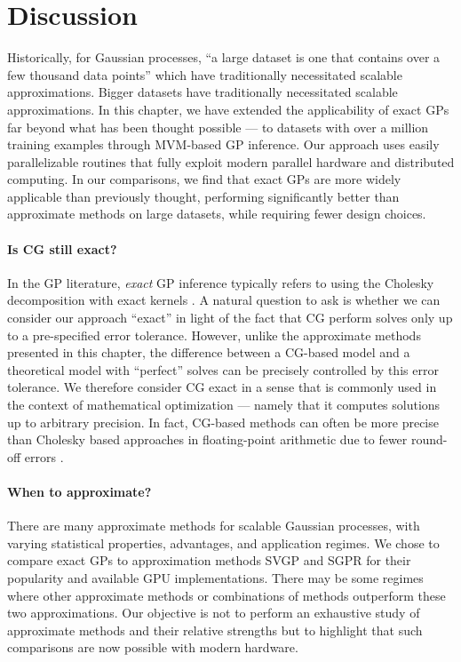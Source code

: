 \section{Discussion}

Historically, for Gaussian processes, ``a large dataset is one that contains over a few thousand data points'' \citep{hensman2013gaussian} which have traditionally necessitated scalable approximations.
Bigger datasets have traditionally necessitated
scalable approximations. In this chapter, we have extended
the applicability of exact GPs far beyond what has been
thought possible --- to datasets with over a million training examples through MVM-based GP inference. Our
approach uses easily parallelizable routines that fully exploit modern parallel hardware and distributed computing. In our comparisons, we find that exact GPs are more
widely applicable than previously thought, performing significantly
better than approximate methods on large datasets, while requiring fewer design choices.

\paragraph{Is CG still exact?}
In the GP literature, \emph{exact} GP inference typically refers to using the Cholesky decomposition with exact kernels \citep{rasmussen2006gaussian}.
A natural question to ask is whether we can consider our approach ``exact'' in light of the fact that CG perform solves only up to a pre-specified error tolerance.
However, unlike the approximate methods presented in this chapter, the difference between a CG-based model and a theoretical model with ``perfect'' solves can be precisely controlled by this error tolerance.
We therefore consider CG exact in a sense that is commonly used in the context of mathematical optimization --- namely that it computes solutions up to arbitrary precision.
In fact, CG-based methods can often be more precise than Cholesky based approaches in floating-point arithmetic due to fewer round-off errors \cite{gardner2018gpytorch}.

\paragraph{When to approximate?}
There are many approximate methods for scalable Gaussian
processes, with varying statistical properties, advantages, and application regimes.
We chose to compare exact GPs to approximation methods SVGP and SGPR for their
popularity and available GPU implementations. There may be some regimes where other
approximate methods or combinations of methods outperform these two approximations.
Our objective is not to perform an exhaustive study of approximate methods and
their relative strengths but to highlight that such comparisons are now possible with modern hardware.

